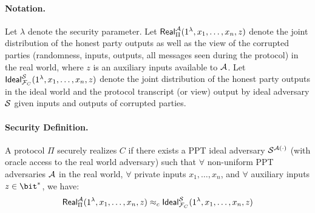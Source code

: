 
\paragraph{Notation.}
Let $\lambda$ denote the security parameter. Let $\mathsf{Real}^{\mathcal{A}}_{\Pi}(1^\lambda, x_1, \ldots, x_n, z)$ denote the joint distribution of the honest party outputs as well as the view of the corrupted parties (randomness, inputs, outputs, all messages seen during the protocol) in the real world, where $z$ is an auxiliary inputs available to $\mathcal{A}$.
Let $\mathsf{Ideal}^{\mathcal{S}}_{\mathcal{F}_C}(1^\lambda, x_1, \ldots, x_n, z)$ denote the joint distribution of the honest party outputs in the ideal world and the protocol transcript (or view) output by ideal adversary $\mathcal{S}$ given inputs and outputs of corrupted parties.

\paragraph{Security Definition.} 
A protocol $\Pi$ securely realizes $C$ if there exists a PPT ideal adversary $\mathcal{S}^{\mathcal{A}(\cdot)}$ (with oracle access to the real world adversary) such that $\forall$ non-uniform PPT adversaries $\mathcal{A}$ in the real world, $\forall$ private inputs $x_1, \ldots, x_n$, and $\forall$ auxiliary inputs $z \in \bit^{\ast}$, we have:
\[ \mathsf{Real}^{\mathcal{A}}_{\Pi}(1^\lambda, x_1, \ldots, x_n, z) \approx_{c} \mathsf{Ideal}^{\mathcal{S}}_{\mathcal{F}_C}(1^\lambda, x_1, \ldots, x_n, z) \]







